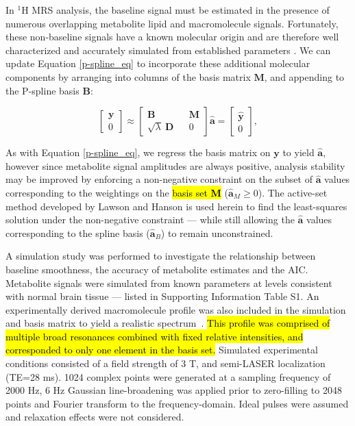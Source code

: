\documentclass[num-refs]{wiley-article}
\newcommand{\revone}[2]{\hl{#1}\marginnote{\hl{#2}}}
\begin{document}
In $^1\mathrm{H}$ MRS analysis, the baseline signal must be estimated in the presence of numerous overlapping metabolite lipid and macromolecule signals. Fortunately, these non-baseline signals have a known molecular origin and are therefore well characterized and accurately simulated from established parameters \cite{Govind2015}. We can update Equation \ref{p-spline_eq} to incorporate these additional molecular components by arranging into columns of the basis matrix $\mathbf{M}$, and appending to the P-spline basis $\mathbf{B}$:

\begin{equation}
  \begin{bmatrix}
    \textbf{y} \\ 0
  \end{bmatrix}
  \approx
  \begin{bmatrix}
    \textbf{B} && \textbf{M} \\ \sqrt{\lambda} \ \textbf{D} && 0
  \end{bmatrix} \hat{\mathbf{a}} =
  \begin{bmatrix}
    \hat{\textbf{y}} \\ 0
  \end{bmatrix},
  \label{mrs_bl}
\end{equation}

As with Equation \ref{p-spline_eq}, we regress the basis matrix on $\mathbf{y}$ to yield $\hat{\mathbf{a}}$, however since metabolite signal amplitudes are always positive, analysis stability may be improved by enforcing a non-negative constraint on the subset of $\hat{\mathbf{a}}$ values corresponding to the weightings on the \revone{basis set $\textbf{M}$}{R2.10} ($\hat{\mathbf{a}}_{M} \geq 0$). The active-set method developed by Lawson and Hanson \cite{Lawson1995} is used herein to find the least-squares solution under the non-negative constraint --- while still allowing the $\hat{\mathbf{a}}$ values corresponding to the spline basis ($\hat{\mathbf{a}}_{B}$) to remain unconstrained.

A simulation study was performed to investigate the relationship between baseline smoothness, the accuracy of metabolite estimates and the AIC. Metabolite signals were simulated from known parameters \cite{Govind2015} at levels consistent with normal brain tissue \cite{deGraaf2018} --- listed in Supporting Information Table S1. An experimentally derived macromolecule profile was also included in the simulation and basis matrix to yield a realistic spectrum~\cite{Birch2017}. \revone{This profile was comprised of multiple broad resonances combined with fixed relative intensities, and corresponded to only one element in the basis set.}{R1.1} Simulated experimental conditions consisted of a field strength of 3 T, and semi-LASER localization (TE=28 ms). 1024 complex points were generated at a sampling frequency of 2000 Hz, 6 Hz Gaussian line-broadening was applied prior to zero-filling to 2048 points and Fourier transform to the frequency-domain. Ideal pulses were assumed and relaxation effects were not considered.
\end{document}
